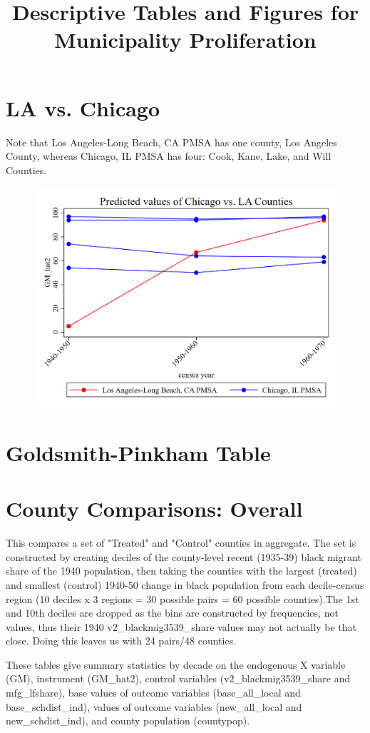 \documentclass{article}
\title{Descriptive Tables and Figures for Municipality Proliferation}
\begin{document}
\maketitle
\tableofcontents
{\footnotesize 
\listoffigures
\listoftables}
\clearpage

\section{LA vs. Chicago}
Note that Los Angeles-Long Beach, CA PMSA has one county, Los Angeles County, whereas Chicago, IL PMSA has four: Cook, Kane, Lake, and Will Counties. 
\begin{figure}
	\includegraphics[width=.33\textwidth]{figures/descriptive/la_chicago_gm_hat2.png}
\end{figure}
\clearpage
\section{Goldsmith-Pinkham Table}
\begin{landscape}

\clearpage
\end{landscape}

\section{County Comparisons: Overall}

This compares a set of "Treated" and "Control" counties in aggregate. The set is constructed by creating deciles of the county-level recent (1935-39) black migrant share of the 1940 population, then taking the counties with the largest (treated) and smallest (control) 1940-50 change in black population from each decile-census region (10 deciles x 3 regions = 30 possible pairs = 60 possible counties).The 1st and 10th deciles are dropped as the bins are constructed by frequencies, not values, thus their 1940 v2\_blackmig3539\_share values may not actually be that close. Doing this leaves us with 24 pairs/48 counties.

 These tables give summary statistics by decade on the endogenous X variable (GM), instrument (GM\_hat2), control variables (v2\_blackmig3539\_share and mfg\_lfshare), base values of outcome variables (base\_all\_local and base\_schdist\_ind), values of outcome variables (new\_all\_local and new\_schdist\_ind), and county population (countypop).
\end{document}
